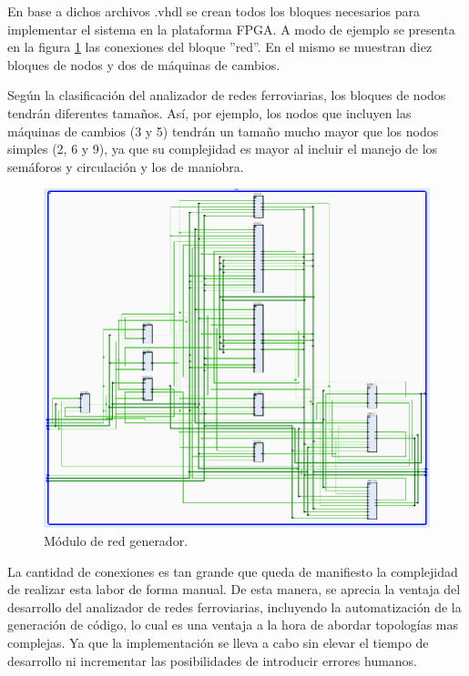 	En base a dichos archivos .vhdl se crean todos los bloques necesarios para implementar el sistema en la plataforma FPGA. A modo de ejemplo se presenta en la figura \ref{fig:Bypass_4} las conexiones del bloque ''red''. En el mismo se muestran diez bloques de nodos y dos de máquinas de cambios. 
	
	Según la clasificación del analizador de redes ferroviarias, los bloques de nodos tendrán diferentes tamaños. Así, por ejemplo, los nodos que incluyen las máquinas de cambios (3 y 5) tendrán un tamaño mucho mayor que los nodos simples (2, 6 y 9), ya que su complejidad es mayor al incluir el manejo de los semáforos y circulación y los de maniobra.
	
	\begin{figure}[h]
	\centering
	\includegraphics[scale=0.6]{./Figures/Red}
		\caption{Módulo de red generador.}
		\label{fig:Bypass_4}
	\end{figure}
	
	\vspace{5cm}
	
	La cantidad de conexiones es tan grande que queda de manifiesto la complejidad de realizar esta labor de forma manual. De esta manera, se aprecia la ventaja del desarrollo del analizador de redes ferroviarias, incluyendo la automatización de la generación de código, lo cual es una ventaja a la hora de abordar topologías mas complejas. Ya que la implementación se lleva a cabo sin elevar el tiempo de desarrollo ni incrementar las posibilidades de introducir errores humanos.
	
